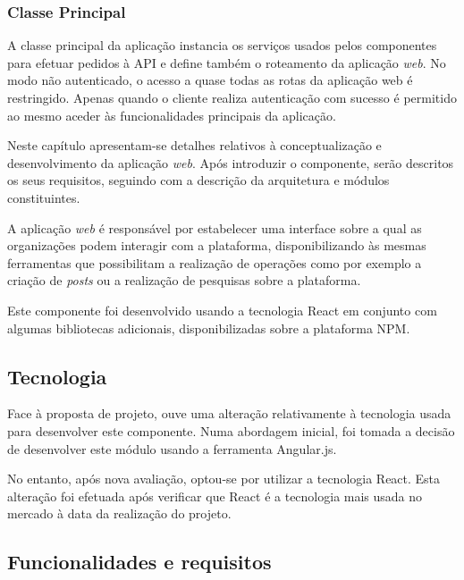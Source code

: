 \subsubsection{Classe Principal}

A classe principal da aplicação instancia os serviços usados pelos componentes para efetuar pedidos à API e define também o roteamento da aplicação \textit{web}. No modo não autenticado, o acesso a quase todas as rotas da aplicação web é restringido. Apenas quando o cliente realiza autenticação com sucesso é permitido ao mesmo aceder às funcionalidades principais da aplicação.

\iffalse

Neste capítulo apresentam-se detalhes relativos à conceptualização e desenvolvimento da aplicação \textit{web}. Após introduzir o componente, serão descritos os seus requisitos, seguindo com a descrição da arquitetura e módulos constituintes.

\par \medskip

A aplicação \textit{web} é responsável por estabelecer uma interface sobre a qual as organizações podem interagir com a plataforma, disponibilizando às mesmas ferramentas que possibilitam a realização de operações como por exemplo a criação de \textit{posts} ou a realização de pesquisas sobre a plataforma.

\par \medskip

Este componente foi desenvolvido usando a tecnologia React em conjunto com algumas bibliotecas adicionais, disponibilizadas sobre a plataforma NPM.

\subsection{Tecnologia}

Face à proposta de projeto, ouve uma alteração relativamente à tecnologia usada para desenvolver este componente. Numa abordagem inicial, foi tomada a decisão de desenvolver este módulo usando a ferramenta Angular.js. \par \medskip

No entanto, após nova avaliação, optou-se por utilizar a tecnologia React. Esta alteração foi efetuada após verificar que React é a tecnologia mais usada no mercado à data da realização do projeto. \par \medskip

\subsection{Funcionalidades e requisitos}

